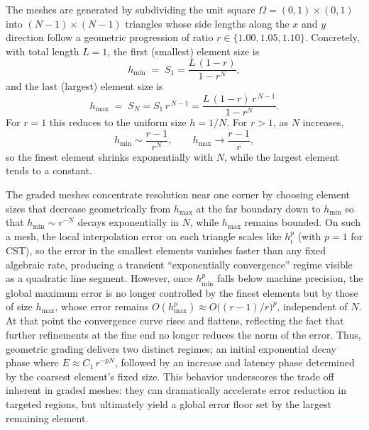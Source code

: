 The meshes are generated by subdividing the unit square \(\Omega=(0,1)\times(0,1)\) into \((N-1)\times (N-1)\) triangles whose side lengths along the \(x\) and \(y\) direction follow a geometric progression of ratio \(r\in\{1.00,1.05,1.10\}\).  Concretely, with total length \(L=1\), the first (smallest) element size is
\[
h_{\min} \;=\; S_1 
= \frac{L\,(1 - r)}{1 - r^N},
\]
and the last (largest) element size is
\[
h_{\max} \;=\; S_N
= S_1\,r^{\,N-1}
= \frac{L\,(1 - r)\,r^{\,N-1}}{1 - r^N}.
\]
For \(r=1\) this reduces to the uniform size \(h=1/N\).  For \(r>1\), as \(N\) increases,
\[
h_{\min}\sim\frac{r-1}{r^N}, 
\qquad
h_{\max}\to\frac{r-1}{r},
\]
so the finest element shrinks exponentially with \(N\), while the largest element tends to a constant.

The graded meshes concentrate resolution near one corner by choosing element sizes that decrease geometrically from \(h_{\max}\) at the far boundary down to \(h_{\min}\) so that \(h_{\min}\sim r^{-N}\) decays exponentially in \(N\), while \(h_{\max}\) remains bounded. On such a mesh, the local interpolation error on each triangle scales like \(h_i^p\) (with \(p=1\) for CST), so the error in the smallest elements vanishes faster than any fixed algebraic rate, producing a transient “exponentially convergence” regime visible as a quadratic line segment.  However, once \(h_{\min}^p\) falls below machine precision, the global maximum error is no longer controlled by the finest elements but by those of size \(h_{\max}\), whose error remains \(O(h_{\max}^p)\approx O\bigl((r-1)/r\bigr)^p\), independent of \(N\).  At that point the convergence curve rises and flattens, reflecting the fact that further refinements at the fine end no longer reduces the norm of the error. Thus, geometric grading delivers two distinct regimes; an initial exponential decay phase where \(E\approx C_1\,r^{-pN}\), followed by an increase and latency phase determined by the coarsest element's fixed size. This behavior underscores the trade off inherent in graded meshes: they can dramatically accelerate error reduction in targeted regions, but ultimately yield a global error floor set by the largest remaining element. 


